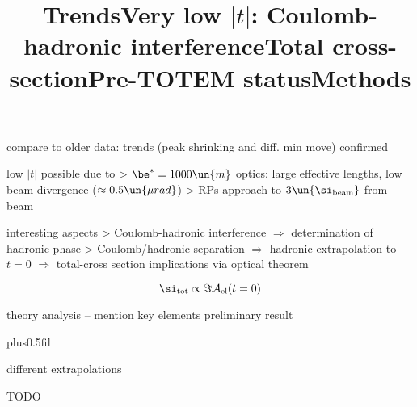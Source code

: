 \newpage %
\title{Trends}

\> compare to older data: trends (peak shrinking and diff. min move) confirmed





\newpage %
\title{Very low $|t|$: Coulomb-hadronic interference}

\> low $|t|$ possible due to
\>> $\be^* = 1000\un{m}$ optics: large effective lengths, low beam divergence ($\approx 0.5\un{\mu rad}$)
\>> RPs approach to $3\un{\si_{\rm beam}}$ from beam

\> interesting aspects
\>> Coulomb-hadronic interference $\Rightarrow$ determination of hadronic phase
\>> Coulomb/hadronic separation $\Rightarrow$ hadronic extrapolation to $t = 0$ $\Rightarrow$ total-cross section implications via optical theorem

$$\si_{\rm tot} \propto \Im {\cal A_{\rm el}}(t = 0)$$


\> theory
\> analysis -- mention key elements
\> preliminary result

\newpage %
\hbox{}
\vfil
\title{Total cross-section}

\vskip0pt plus0.5fil

\vfil
\newpage %
\title{Pre-TOTEM status}


\> different extrapolations


\newpage %
\title{Methods}

\> TODO


